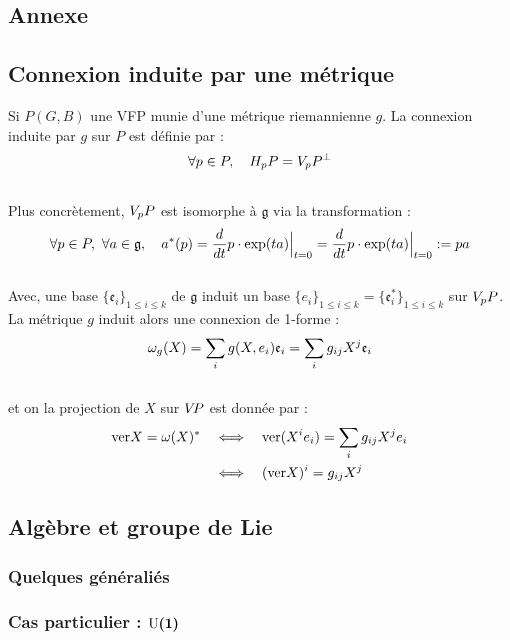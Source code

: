 \begin{annexe}

\section{Annexe}

\subsection{Connexion induite par une métrique} \label{ann:conn2submer_riemanian}

Si $P(G,B)$ une VFP munie d'une métrique riemannienne $g$. La connexion induite par $g$ sur $P$ est définie par :
\begin{equation}
	\forall p\in P,\quad \hg[p]{P} = \vg[p]{P}^\perp
\end{equation}
\\
Plus concrètement, $\vg[p]{P}$ est isomorphe à $\mathfrak{g}$ via la transformation :
\[\forall p\in P,\ \forall a\in\mathfrak{g},\quad a^*(p) = \frac{d}{dt} p\cdot \exp(t a)\Big|_{t=0} = \frac{d}{dt} p\cdot \exp(t a)\Big|_{t=0}\defeq pa\]
\\
Avec, une base $\{\mathfrak{e}_i\}_{1\leq i\leq k}$ de $\mathfrak{g}$ induit un base $\{e_i\}_{1\leq i\leq k} = \{\mathfrak{e}^*_i\}_{1\leq i\leq k}$ sur $\vg[p]{P}$. La métrique $g$ induit alors une connexion de 1-forme :
\[\conn_g(X) = \sum_i g(X, e_i) \mathfrak{e}_i = \sum_i g_{ij}X^j \mathfrak{e}_i\]
\\
et on la projection de $X$ sur $\vg{P}$ est donnée par :
\begin{align*}
	\ver X = \conn(X)^*\quad &\Llr\quad  \ver (X^ie_i) = \sum_i g_{ij}X^j e_i \\
	&\Llr\quad  (\ver X)^i = g_{ij}X^j
\end{align*}


\subsection{Algèbre et groupe de Lie} \label{ann:2Lie}

\subsubsection{Quelques généraliés}

\subsubsection{Cas particulier : $\bf{\U{1}}$}




\end{annexe}

